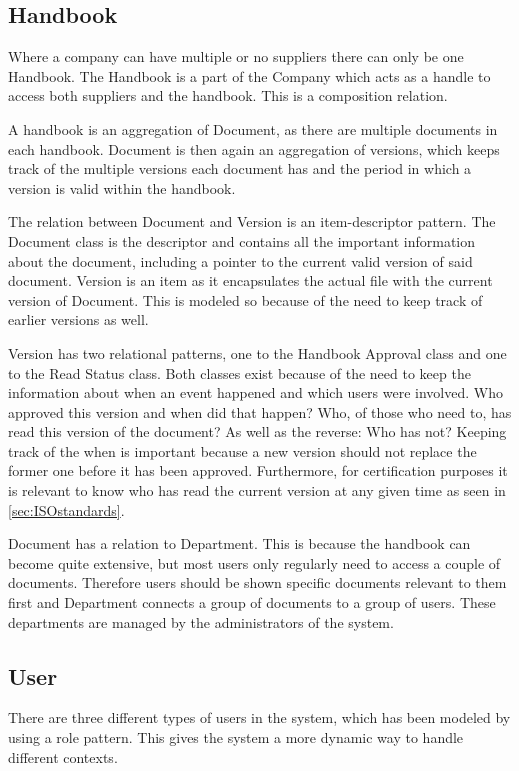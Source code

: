 \subsection{Handbook}\label{sec:classdiagramhandbook}
Where a company can have multiple or no suppliers there can only be one Handbook.
The Handbook is a part of the Company which acts as a handle to access both suppliers and the handbook. This is a composition relation.

A handbook is an aggregation of Document, as there are multiple documents in each handbook.
Document is then again an aggregation of versions, which keeps track of the multiple versions each document has and the period in which a version is valid within the handbook.

The relation between Document and Version is an item-descriptor pattern.
The Document class is the descriptor and contains all the important information about the document, including a pointer to the current valid version of said document.
Version is an item as it encapsulates the actual file with the current version of Document.
This is modeled so because of the need to keep track of earlier versions as well.

Version has two relational patterns, one to the Handbook Approval class and one to the Read Status class.
Both classes exist because of the need to keep the information about when an event happened and which users were involved.
Who approved this version and when did that happen?
Who, of those who need to, has read this version of the document?
As well as the reverse: Who has not?
Keeping track of the when is important because a new version should not replace the former one before it has been approved.
Furthermore, for certification purposes it is relevant to know who has read the current version at any given time as seen in \cref{sec:ISOstandards}.

Document has a relation to Department.
This is because the handbook can become quite extensive, but most users only regularly need to access a couple of documents.
Therefore users should be shown specific documents relevant to them first and Department connects a group of documents to a group of users.
These departments are managed by the administrators of the system.

\subsection{User}\label{sec:user}
There are three different types of users in the system, which has been modeled by using a role pattern. This gives the system a more dynamic way to handle different contexts.


